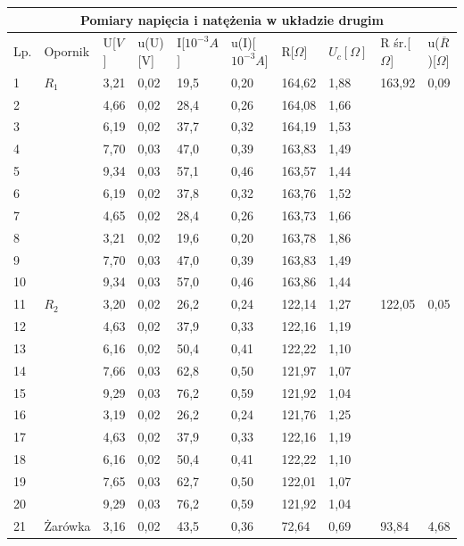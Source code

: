 \documentclass[12pt]{article}
\begin{document}
\begin{adjustbox}{center}
\begin{tabular}{|p{0.5cm}|p{1.5cm}|p{1.2cm}|p{1.5cm}|p{1.5cm}|p{2cm}|p{1.3cm}|p{1.5cm}|p{1.5cm}|p{1.5cm}|}
    
    \hline
    \multicolumn{10}{|c|}{Pomiary napięcia i natężenia w układzie drugim} \\
    \hline
    Lp. & Opornik& U[$V$]& u(U)[V] & I[$10^{-3}A$] & u(I)[$10^{-3}A$] & R[$\Omega$] & $U_c[\Omega]$ & R śr.[$\Omega$] & u($\overline{R}$)[$\Omega$] \\ 
    \hline
    1 & $R_1$ & 3,21 & 0,02 & 19,5 & 0,20 & 164,62 & 1,88 & 163,92 & 0,09\\
    2 && 4,66 & 0,02 & 28,4 & 0,26 & 164,08& 1,66 && \\
    3 && 6,19 & 0,02& 37,7 & 0,32 & 164,19& 1,53 && \\
    4 && 7,70 & 0,03& 47,0 & 0,39 & 163,83& 1,49 && \\
    5 && 9,34 & 0,03& 57,1 & 0,46 & 163,57& 1,44&& \\
    6 && 6,19 & 0,02& 37,8 & 0,32 & 163,76& 1,52&& \\
    7 && 4,65 & 0,02& 28,4 & 0,26 & 163,73& 1,66&& \\
    8 && 3,21 & 0,02& 19,6 & 0,20 & 163,78& 1,86&& \\
    9 && 7,70 & 0,03& 47,0 & 0,39 & 163,83& 1,49&& \\
    10 && 9,34 & 0,03 & 57,0 & 0,46 & 163,86& 1,44&& \\
    \hline
    11 & $R_2$ & 3,20 & 0,02 & 26,2 & 0,24 & 122,14 & 1,27 & 122,05 & 0,05 \\
    12 && 4,63 & 0,02 & 37,9 & 0,33 & 122,16& 1,19 && \\
    13 && 6,16 & 0,02 & 50,4 & 0,41 & 122,22& 1,10 && \\
    14 && 7,66 & 0,03 & 62,8 & 0,50 & 121,97& 1,07 && \\
    15 && 9,29 & 0,03 & 76,2 & 0,59 & 121,92& 1,04 && \\
    16 && 3,19 & 0,02 & 26,2 & 0,24 & 121,76& 1,25 && \\
    17 && 4,63 & 0,02 & 37,9 & 0,33 & 122,16& 1,19 && \\
    18 && 6,16 & 0,02 & 50,4 & 0,41 & 122,22& 1,10 && \\
    19 && 7,65 & 0,03 & 62,7 & 0,50 & 122,01& 1,07 && \\
    20 && 9,29 & 0,03 & 76,2 & 0,59 & 121,92& 1,04 && \\
    \hline
    21 & Żarówka & 3,16 & 0,02 & 43,5 & 0,36 & 72,64 & 0,69 & 93,84 & 4,68 \\

\end{tabular}
\end{adjustbox}
\end{document}
